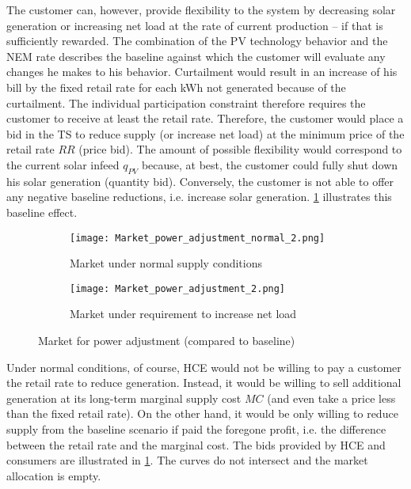 The customer can, however, provide flexibility to the system by decreasing solar generation or increasing net load at the rate of current production -- if that is sufficiently rewarded. 
The combination of the PV technology behavior and the NEM rate describes the baseline against which the customer will evaluate any changes he makes to his behavior.
Curtailment would result in an increase of his bill by the fixed retail rate for each kWh not generated because of the curtailment. The individual participation constraint therefore requires the customer to receive at least the retail rate. Therefore, the customer would place a bid in the TS to reduce supply (or increase net load) at the minimum price of the retail rate $RR$  (price bid).
The amount of possible flexibility would correspond to the current solar infeed $q_{PV}$ because, at best, the customer could fully shut down his solar generation (quantity bid). Conversely, the customer is not able to offer any negative baseline reductions, i.e. increase solar generation. \cref{fig:lem_adjustment_normal} illustrates this baseline effect.

\begin{figure}[t]\label{fig:baseline}
  \begin{subfigure}[t]{0.485\linewidth}
    \centering\texttt{[image: Market\_power\_adjustment\_normal\_2.png]}
    \caption{Market under normal supply conditions}
    \label{fig:lem_adjustment_normal}
  \end{subfigure}\hspace{0.5cm}
  \begin{subfigure}[t]{.485\linewidth}
    \centering\texttt{[image: Market\_power\_adjustment\_2.png]}
    \caption{Market under requirement to increase net load} 
    \label{fig:lem_adjustment}
  \end{subfigure}
\caption{Market for power adjustment (compared to baseline)}
\end{figure}

Under normal conditions, of course, HCE would not be willing to pay a customer the retail rate to reduce generation. Instead, it would be willing to sell additional generation at its long-term marginal supply cost $MC$ (and even take a price less than the fixed retail rate). On the other hand, it would be only willing to reduce supply from the baseline scenario if paid the foregone profit, i.e. the difference between the retail rate and the marginal cost. The bids provided by HCE and consumers are illustrated in \cref{fig:lem_adjustment_normal}. The curves do not intersect and the market allocation is empty.

